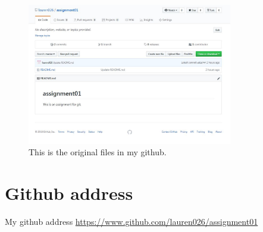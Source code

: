 \documentclass[a4paper]{article}
\begin{document}
\begin{figure}
\begin{center}
	\includegraphics[width=0.8\textwidth]{screenshot01.JPG}
	\caption{\label{fig:screenshot01} This is the original files in my github.}
\end{center}
\end{figure}

\section{Github address}
My github address
\url{https://www.github.com/lauren026/assignment01}
\end{document}
